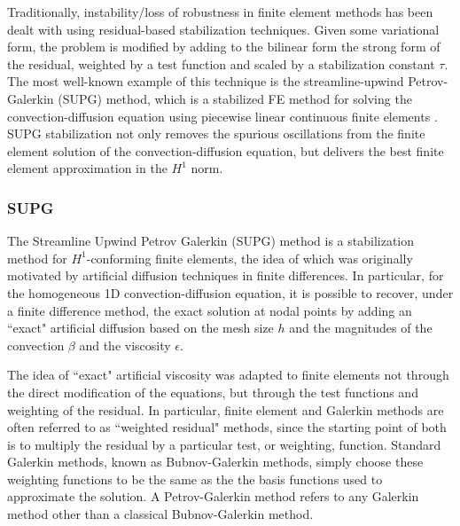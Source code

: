 \documentclass{report}
\begin{document}
Traditionally, instability/loss of robustness in finite element methods has been dealt with using residual-based stabilization techniques.  Given some variational form, the problem is modified by adding to the bilinear form the strong form of the residual, weighted by a test function and scaled by a stabilization constant $\tau$.  The most well-known example of this technique is the streamline-upwind Petrov-Galerkin (SUPG) method, which is a stabilized FE method for solving the convection-diffusion equation using piecewise linear continuous finite elements \cite{SUPG}.  SUPG stabilization not only removes the spurious oscillations from the finite element solution of the convection-diffusion equation, but delivers the best finite element approximation in the $H^1$ norm.  

\subsubsection{SUPG}

The Streamline Upwind Petrov Galerkin (SUPG) method is a stabilization method for $H^1$-conforming finite elements, the idea of which was originally motivated by artificial diffusion techniques in finite differences.  In particular, for the homogeneous 1D convection-diffusion equation, it is possible to recover, under a finite difference method, the exact solution at nodal points by adding an ``exact" artificial diffusion based on the mesh size $h$ and the magnitudes of the convection $\beta$ and the viscosity $\epsilon$.  

The idea of ``exact" artificial viscosity was adapted to finite elements not through the direct modification of the equations, but through the test functions and weighting of the residual.  In particular, finite element and Galerkin methods are often referred to as ``weighted residual" methods, since the starting point of both is to multiply the residual by a particular test, or weighting, function.  Standard Galerkin methods, known as Bubnov-Galerkin methods, simply choose these weighting functions to be the same as the the basis functions used to approximate the solution.  A Petrov-Galerkin method refers to any Galerkin method other than a classical Bubnov-Galerkin method.  
\end{document}
